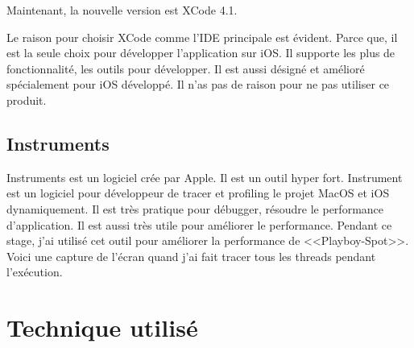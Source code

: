 Maintenant, la nouvelle version est XCode 4.1. 

Le raison pour choisir XCode comme l'IDE principale est évident. Parce que, il est la seule choix pour développer l'application sur iOS. Il supporte les plus de fonctionnalité, les outils pour développer. Il est aussi désigné et amélioré spécialement pour iOS développé. Il n'as pas de raison pour ne pas utiliser ce produit.


\subsection{Instruments} %
\label{sub:instrument}


Instruments est un logiciel crée par Apple. Il est un outil hyper fort. Instrument est un logiciel pour développeur de tracer et profiling le projet MacOS et iOS dynamiquement. Il est très pratique pour débugger, résoudre le performance d'application. Il est aussi très utile pour améliorer le performance. Pendant ce stage, j'ai utilisé cet outil pour améliorer la performance de <<Playboy-Spot>>. 
Voici une capture de l'écran quand j'ai fait tracer tous les threads pendant l'exécution. 



\section{Technique utilisé} %
\label{sec:technique_utilisé}



